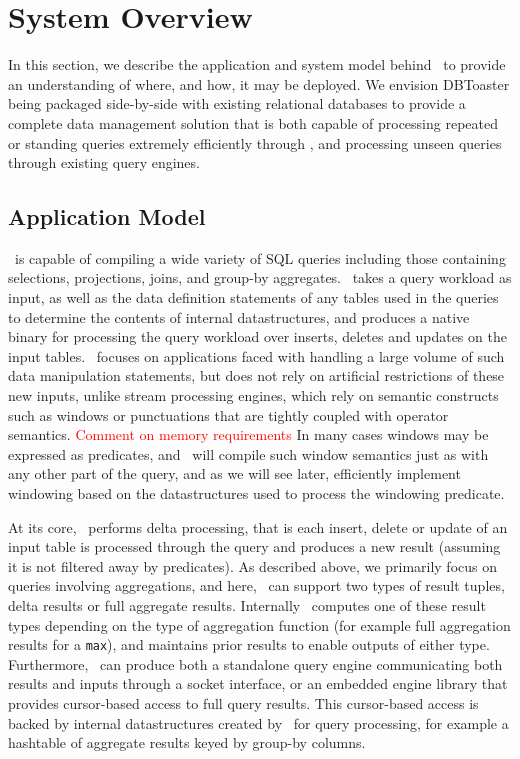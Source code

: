 \section{System Overview}
In this section, we describe the application and system model behind \compiler\
to provide an understanding of where, and how, it may be deployed. We envision
DBToaster being packaged side-by-side with existing relational databases to
provide a complete data management solution that is both capable of processing
repeated or standing queries extremely efficiently through \compiler, and
processing unseen queries through existing query engines. 

\subsection{Application Model}
\compiler\ is capable of compiling a wide variety of SQL queries including those
containing selections, projections, joins, and group-by aggregates. \compiler\
takes a query workload as input, as well as the data definition statements of any
tables used in the queries to determine the contents of internal datastructures,
and produces a native binary for processing the query workload over inserts,
deletes and updates on the input tables. \compiler\ focuses on applications faced
with handling a large volume of such data manipulation statements, but does not
rely on artificial restrictions of these new inputs, unlike stream processing
engines, which rely on semantic constructs such as windows or punctuations that
are tightly coupled with operator semantics.
\textcolor{red}{Comment on memory requirements}
In many cases windows may be expressed as predicates, and \compiler\ will compile
such window semantics just as with any other part of the query, and as we will
see later, efficiently implement windowing based on the datastructures used to
process the windowing predicate.

At its core, \compiler\ performs delta processing, that is each insert, delete
or update of an input table is processed through the query and produces a new
result (assuming it is not filtered away by predicates). As described above, we
primarily focus on queries involving aggregations, and here, \compiler\ can
support two types of result tuples, delta results or full aggregate results.
Internally \compiler\ computes one of these result types depending
on the type of aggregation function (for example full aggregation
results for a \texttt{max}), and maintains prior results to enable outputs
of either type. Furthermore, \compiler\ can produce both a standalone query
engine communicating both results and inputs through a socket interface, or an
embedded engine library that provides cursor-based access to full query results.
This cursor-based access is backed by internal datastructures created by
\compiler\ for query processing, for example a hashtable of aggregate results
keyed by group-by columns.


